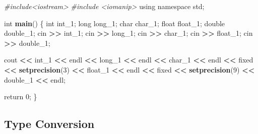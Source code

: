 \documentclass[
]{article}
\newenvironment{Shaded}{\begin{snugshade}}{\end{snugshade}}
\newcommand{\CommentTok}[1]{\textcolor[rgb]{0.56,0.35,0.01}{\textit{#1}}}
\newcommand{\DecValTok}[1]{\textcolor[rgb]{0.00,0.00,0.81}{#1}}
\newcommand{\ErrorTok}[1]{\textcolor[rgb]{0.64,0.00,0.00}{\textbf{#1}}}
\newcommand{\FunctionTok}[1]{\textcolor[rgb]{0.13,0.29,0.53}{\textbf{#1}}}
\newcommand{\NormalTok}[1]{#1}
\newcommand{\SpecialCharTok}[1]{\textcolor[rgb]{0.81,0.36,0.00}{\textbf{#1}}}
\begin{document}
\begin{Shaded}
\begin{Highlighting}[]
\CommentTok{\#include\textless{}iostream\textgreater{}}
\CommentTok{\#include \textless{}iomanip\textgreater{} }
\NormalTok{using namespace std;}

\NormalTok{int }\FunctionTok{main}\NormalTok{()  \{}
\NormalTok{    int int\_1; long long\_1; char char\_1; float float\_1; double double\_1; }
\NormalTok{    cin }\SpecialCharTok{\textgreater{}}\ErrorTok{\textgreater{}}\NormalTok{ int\_1;}
\NormalTok{    cin }\SpecialCharTok{\textgreater{}}\ErrorTok{\textgreater{}}\NormalTok{ long\_1;   }
\NormalTok{    cin }\SpecialCharTok{\textgreater{}}\ErrorTok{\textgreater{}}\NormalTok{ char\_1;  }
\NormalTok{    cin }\SpecialCharTok{\textgreater{}}\ErrorTok{\textgreater{}}\NormalTok{ float\_1;  }
\NormalTok{    cin }\SpecialCharTok{\textgreater{}}\ErrorTok{\textgreater{}}\NormalTok{ double\_1;  }
    
\NormalTok{    cout }\SpecialCharTok{\textless{}}\ErrorTok{\textless{}}\NormalTok{ int\_1 }\SpecialCharTok{\textless{}}\ErrorTok{\textless{}}\NormalTok{ endl }\SpecialCharTok{\textless{}}\ErrorTok{\textless{}}\NormalTok{ long\_1 }\SpecialCharTok{\textless{}}\ErrorTok{\textless{}}\NormalTok{ endl }\SpecialCharTok{\textless{}}\ErrorTok{\textless{}}\NormalTok{ char\_1 }\SpecialCharTok{\textless{}}\ErrorTok{\textless{}}\NormalTok{ endl }\SpecialCharTok{\textless{}}\ErrorTok{\textless{}}\NormalTok{ fixed }\SpecialCharTok{\textless{}}\ErrorTok{\textless{}} \FunctionTok{setprecision}\NormalTok{(}\DecValTok{3}\NormalTok{) }\SpecialCharTok{\textless{}}\ErrorTok{\textless{}}\NormalTok{ float\_1 }\SpecialCharTok{\textless{}}\ErrorTok{\textless{}}\NormalTok{ endl }\SpecialCharTok{\textless{}}\ErrorTok{\textless{}}\NormalTok{ fixed }\SpecialCharTok{\textless{}}\ErrorTok{\textless{}} \FunctionTok{setprecision}\NormalTok{(}\DecValTok{9}\NormalTok{) }\SpecialCharTok{\textless{}}\ErrorTok{\textless{}}\NormalTok{ double\_1 }\SpecialCharTok{\textless{}}\ErrorTok{\textless{}}\NormalTok{ endl;}
        
\NormalTok{    return }\DecValTok{0}\NormalTok{;}
\NormalTok{\}}
\end{Highlighting}
\end{Shaded}

\subsection{Type Conversion}\label{type-conversion}
\end{document}
